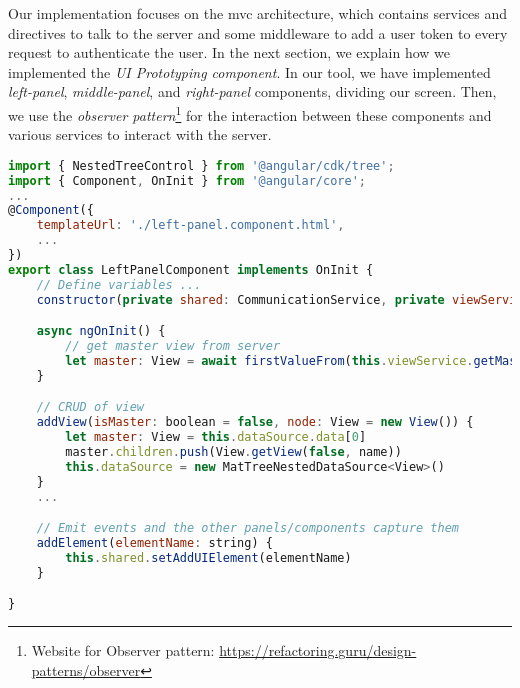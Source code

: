 Our implementation focuses on the \ac{mvc} architecture, which contains services and directives to talk to the server and some middleware to add a user token to every request to authenticate the user. In the next section, we explain how we implemented the \textit{UI Prototyping component}.
In our tool, we have implemented \textit{left-panel}, \textit{middle-panel}, and \textit{right-panel} components, dividing our screen. 
Then, we use the \textit{observer pattern}\footnote{Website for Observer pattern: \url{https://refactoring.guru/design-patterns/observer}} for the interaction between these components and various services to interact with the server.

\begin{lstlisting}[language=JavaScript, caption=left-panel.component.ts, label=listing:implementation:left]
import { NestedTreeControl } from '@angular/cdk/tree';
import { Component, OnInit } from '@angular/core';
...
@Component({
    templateUrl: './left-panel.component.html',
    ...
})
export class LeftPanelComponent implements OnInit {
    // Define variables ...
    constructor(private shared: CommunicationService, private viewService: ViewsService, ...) { }

    async ngOnInit() {
        // get master view from server
        let master: View = await firstValueFrom(this.viewService.getMasterView())
    }

    // CRUD of view
    addView(isMaster: boolean = false, node: View = new View()) {
        let master: View = this.dataSource.data[0]
        master.children.push(View.getView(false, name))
        this.dataSource = new MatTreeNestedDataSource<View>()
    }
    ...

    // Emit events and the other panels/components capture them
    addElement(elementName: string) {
        this.shared.setAddUIElement(elementName)
    }

}    
\end{lstlisting}
